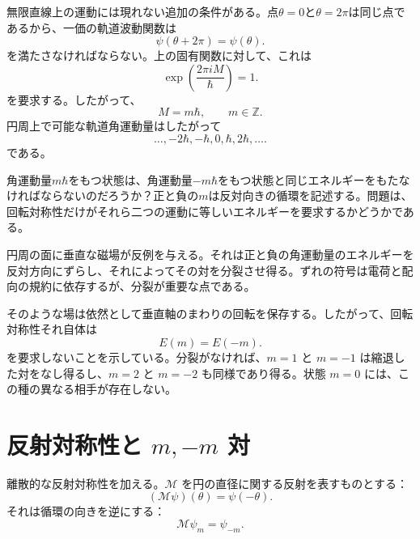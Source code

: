 無限直線上の運動には現れない追加の条件がある。点\(\theta=0\)と\(\theta=2\pi\)は同じ点であるから、一価の軌道波動関数は
\begin{equation}
\psi(\theta+2\pi)=\psi(\theta).
\end{equation}
を満たさなければならない。上の固有関数に対して、これは
\begin{equation}
\exp\left(\frac{2\pi iM}{\hbar}\right)=1.
\end{equation}
を要求する。したがって、
\begin{equation}
M=m\hbar,
\qquad
m\in\mathbb Z.
\end{equation}
円周上で可能な軌道角運動量はしたがって
\begin{equation}
\ldots,-2\hbar,-\hbar,0,\hbar,2\hbar,\ldots.
\end{equation}
である。

角運動量\(m\hbar\)をもつ状態は、角運動量\(-m\hbar\)をもつ状態と同じエネルギーをもたなければならないのだろうか？正と負の\(m\)は反対向きの循環を記述する。問題は、回転対称性だけがそれら二つの運動に等しいエネルギーを要求するかどうかである。

\begin{classroomqa}
\end{classroomqa}

円周の面に垂直な磁場が反例を与える。それは正と負の角運動量のエネルギーを反対方向にずらし、それによってその対を分裂させ得る。ずれの符号は電荷と配向の規約に依存するが、分裂が重要な点である。

そのような場は依然として垂直軸のまわりの回転を保存する。したがって、回転対称性それ自体は
\begin{equation}
E(m)=E(-m).
\end{equation}
を要求しないことを示している。分裂がなければ、\(m=1\) と \(m=-1\) は縮退した対をなし得るし、\(m=2\) と \(m=-2\) も同様であり得る。状態 \(m=0\) には、この種の異なる相手が存在しない。

\section{反射対称性と \texorpdfstring{\(m,-m\)}{m, -m} 対}

離散的な反射対称性を加える。\(\mathcal M\) を円の直径に関する反射を表すものとする：
\begin{equation}
(\mathcal M\psi)(\theta)=\psi(-\theta).
\end{equation}
それは循環の向きを逆にする：
\begin{equation}
\mathcal M\psi_m=\psi_{-m}.
\end{equation}

